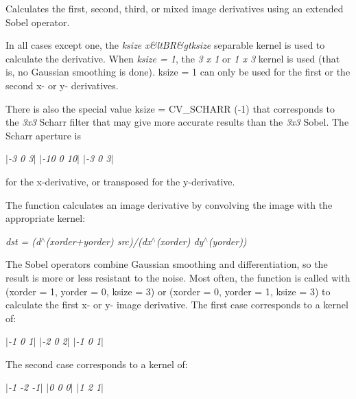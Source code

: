 Calculates the first, second, third, or mixed image derivatives using an extended Sobel operator.

In all cases except one, the {\itshape ksize x\&lt\+BR\&gtksize} separable kernel is used to calculate the derivative. When {\itshape ksize = 1}, the {\itshape 3 x 1} or {\itshape 1 x 3} kernel is used (that is, no Gaussian smoothing is done). {\ttfamily ksize = 1} can only be used for the first or the second x-\/ or y-\/ derivatives.

There is also the special value {\ttfamily ksize = C\+V\+\_\+\+S\+C\+H\+A\+RR} (-\/1) that corresponds to the {\itshape 3x3} Scharr filter that may give more accurate results than the {\itshape 3x3} Sobel. The Scharr aperture is

{\itshape  $\vert$-\/3 0 3$\vert$ $\vert$-\/10 0 10$\vert$ $\vert$-\/3 0 3$\vert$ }

for the x-\/derivative, or transposed for the y-\/derivative.

The function calculates an image derivative by convolving the image with the appropriate kernel\+:

{\itshape dst = (d$^\wedge$(xorder+yorder) src)/(dx$^\wedge$(xorder) dy$^\wedge$(yorder))}

The Sobel operators combine Gaussian smoothing and differentiation, so the result is more or less resistant to the noise. Most often, the function is called with ({\ttfamily xorder} = 1, {\ttfamily yorder} = 0, {\ttfamily ksize} = 3) or ({\ttfamily xorder} = 0, {\ttfamily yorder} = 1, {\ttfamily ksize} = 3) to calculate the first x-\/ or y-\/ image derivative. The first case corresponds to a kernel of\+:

{\itshape  $\vert$-\/1 0 1$\vert$ $\vert$-\/2 0 2$\vert$ $\vert$-\/1 0 1$\vert$ }

The second case corresponds to a kernel of\+:

{\itshape  $\vert$-\/1 -\/2 -\/1$\vert$ $\vert$0 0 0$\vert$ $\vert$1 2 1$\vert$ }



